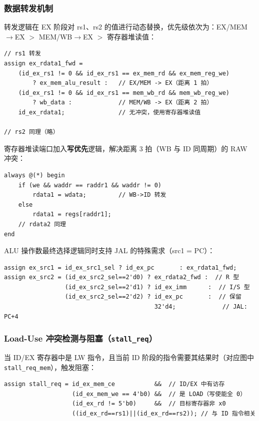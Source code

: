 \documentclass[12pt,hyperref,a4paper,UTF8]{ctexart}
\begin{document}
\subsubsection{数据转发机制}

转发逻辑在 EX 阶段对 rs1、rs2 的值进行动态替换，优先级依次为：EX/MEM$\rightarrow$EX $>$ MEM/WB$\rightarrow$EX $>$ 寄存器堆读值：

\begin{lstlisting}[caption={EX 阶段数据转发逻辑}]
// rs1 转发
assign ex_rdata1_fwd =
    (id_ex_rs1 != 0 && id_ex_rs1 == ex_mem_rd && ex_mem_reg_we)
        ? ex_mem_alu_result :   // EX/MEM -> EX（距离 1 拍）
    (id_ex_rs1 != 0 && id_ex_rs1 == mem_wb_rd && mem_wb_reg_we)
        ? wb_data :             // MEM/WB -> EX（距离 2 拍）
    id_ex_rdata1;               // 无冲突，使用寄存器堆读值

// rs2 同理（略）
\end{lstlisting}

寄存器堆读端口加入\textbf{写优先}逻辑，解决距离 3 拍（WB 与 ID 同周期）的 RAW 冲突：

\begin{lstlisting}[caption={寄存器堆写优先（WB$\rightarrow$ID 转发）}]
always @(*) begin
    if (we && waddr == raddr1 && waddr != 0)
        rdata1 = wdata;         // WB->ID 转发
    else
        rdata1 = regs[raddr1];
    // rdata2 同理
end
\end{lstlisting}

ALU 操作数最终选择逻辑同时支持 JAL 的特殊需求（src1 = PC）：

\begin{lstlisting}[caption={ALU 操作数选择（含 JAL src1 = PC）}]
assign ex_src1 = id_ex_src1_sel ? id_ex_pc       : ex_rdata1_fwd;
assign ex_src2 = (id_ex_src2_sel==2'd0) ? ex_rdata2_fwd :  // R 型
                 (id_ex_src2_sel==2'd1) ? id_ex_imm      :  // I/S 型
                 (id_ex_src2_sel==2'd2) ? id_ex_pc       :  // 保留
                                          32'd4;             // JAL: PC+4
\end{lstlisting}

\subsubsection{Load-Use 冲突检测与阻塞（\texttt{stall\_req}）}

当 ID/EX 寄存器中是 LW 指令，且当前 ID 阶段的指令需要其结果时（对应图中 \texttt{stall\_req\_mem}），触发阻塞：

\begin{lstlisting}[caption={Load-Use 冲突检测（stall\_req）}]
assign stall_req = id_ex_mem_ce           &&  // ID/EX 中有访存
                   (id_ex_mem_we == 4'b0) &&  // 是 LOAD（写使能全 0）
                   (id_ex_rd != 5'b0)     &&  // 目标寄存器非 x0
                   ((id_ex_rd==rs1)||(id_ex_rd==rs2)); // 与 ID 指令相关
\end{lstlisting}
\end{document}
